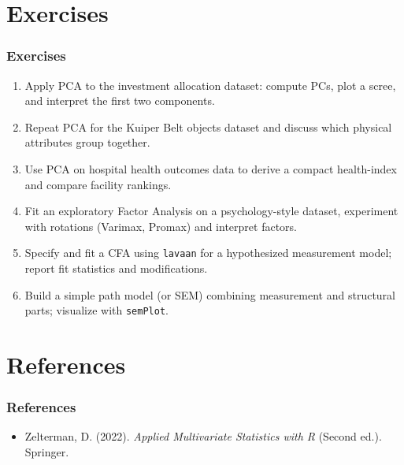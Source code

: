 \documentclass{beamer}
\newcommand{\code}[1]{\texttt{#1}}
\begin{document}
\section{Exercises}

\begin{frame}
    \frametitle{Exercises}
    \begin{enumerate}
        \item Apply PCA to the investment allocation dataset: compute PCs, plot a scree, and interpret the first two components.
        \item Repeat PCA for the Kuiper Belt objects dataset and discuss which physical attributes group together.
        \item Use PCA on hospital health outcomes data to derive a compact health-index and compare facility rankings.
        \item Fit an exploratory Factor Analysis on a psychology-style dataset, experiment with rotations (Varimax, Promax) and interpret factors.
        \item Specify and fit a CFA using \code{lavaan} for a hypothesized measurement model; report fit statistics and modifications.
        \item Build a simple path model (or SEM) combining measurement and structural parts; visualize with \code{semPlot}.
    \end{enumerate}
\end{frame}

\section*{References}
\begin{frame}
    \frametitle{References}
    \begin{itemize}
        \item Zelterman, D. (2022). \textit{Applied Multivariate Statistics with R} (Second ed.). Springer.
    \end{itemize}
\end{frame}
\end{document}
